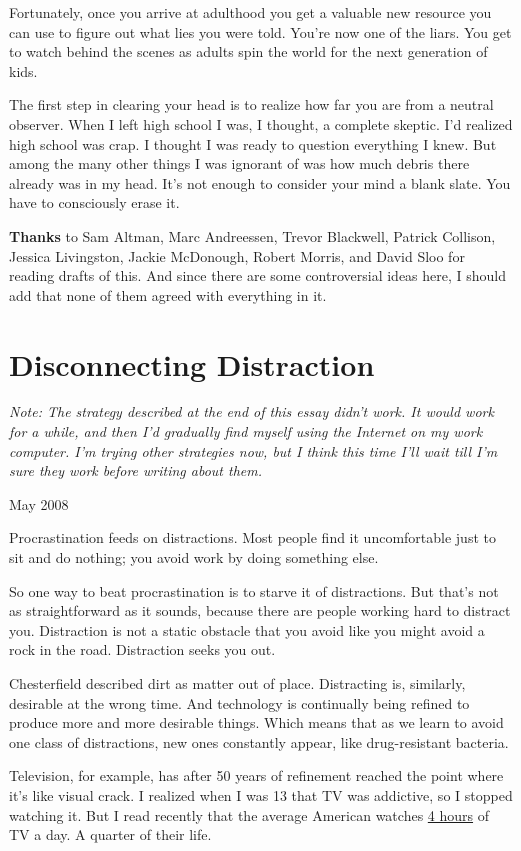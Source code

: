 \documentclass[12pt]{book}
\begin{document}
Fortunately, once you arrive at adulthood you get a valuable new
resource you can use to figure out what lies you were told. You're now
one of the liars. You get to watch behind the scenes as adults spin the
world for the next generation of kids.

The first step in clearing your head is to realize how far you are from
a neutral observer. When I left high school I was, I thought, a complete
skeptic. I'd realized high school was crap. I thought I was ready to
question everything I knew. But among the many other things I was
ignorant of was how much debris there already was in my head. It's not
enough to consider your mind a blank slate. You have to consciously
erase it.


\textbf{Thanks} to Sam Altman, Marc Andreessen, Trevor Blackwell,
Patrick Collison, Jessica Livingston, Jackie McDonough, Robert Morris,
and David Sloo for reading drafts of this. And since there are some
controversial ideas here, I should add that none of them agreed with
everything in it.
\chapter{Disconnecting Distraction}

\emph{Note: The strategy described at the end of this essay didn't work.
It would work for a while, and then I'd gradually find myself using the
Internet on my work computer. I'm trying other strategies now, but I
think this time I'll wait till I'm sure they work before writing about
them.}

May 2008

Procrastination feeds on distractions. Most people find it uncomfortable
just to sit and do nothing; you avoid work by doing something else.

So one way to beat procrastination is to starve it of distractions. But
that's not as straightforward as it sounds, because there are people
working hard to distract you. Distraction is not a static obstacle that
you avoid like you might avoid a rock in the road. Distraction seeks you
out.

Chesterfield described dirt as matter out of place. Distracting is,
similarly, desirable at the wrong time. And technology is continually
being refined to produce more and more desirable things. Which means
that as we learn to avoid one class of distractions, new ones constantly
appear, like drug-resistant bacteria.

Television, for example, has after 50 years of refinement reached the
point where it's like visual crack. I realized when I was 13 that TV was
addictive, so I stopped watching it. But I read recently that the
average American watches
\href{http://www.forbes.com/forbes/2003/0929/076.html}{4 hours} of TV a
day. A quarter of their life.
\end{document}
